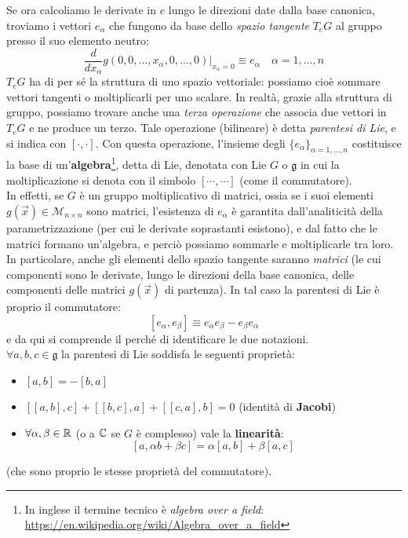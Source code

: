 \documentclass[../../FisicaTeorica.tex]{subfiles}
\begin{document}
Se ora calcoliamo le derivate in $e$ lungo le direzioni date dalla base canonica, troviamo i vettori $e_\alpha$ che fungono da base dello \textit{spazio tangente} $T_e G$ al gruppo presso il suo elemento neutro:
\begin{equation}
\frac{d}{dx_\alpha} g(0,0,\dots, x_\alpha, 0, \dots, 0)\Big|_{x_\alpha=0} \equiv e_\alpha\quad \alpha=1,\dots, n
\label{eqn:spazio-tangente-gruppo}
\end{equation}
$T_e G$ ha di per sé la struttura di uno spazio vettoriale: possiamo cioè sommare vettori tangenti o moltiplicarli per uno scalare. In realtà, grazie alla struttura di gruppo, possiamo trovare anche una \textit{terza operazione} che associa due vettori in $T_e G$ e ne produce un terzo. Tale operazione (bilineare) è detta \textit{parentesi di Lie}, e si indica con $[\cdot, \cdot]$. Con questa operazione, l'insieme degli $\{e_\alpha\}_{\alpha=1,\dots,n}$ costituisce la base di un'\textbf{algebra}\footnote{In inglese il termine tecnico è \textit{algebra over a field}: \url{https://en.wikipedia.org/wiki/Algebra_over_a_field}}, detta di Lie, denotata con Lie $G$ o $\mathfrak{g}$ in cui la moltiplicazione si denota con il simbolo $[\cdots, \cdots]$ (come il commutatore).\\
In effetti, se $G$ è un gruppo moltiplicativo di matrici, ossia se i suoi elementi $g(\vec{x}) \in \mathcal{M}_{ n\times n}$ sono matrici, l'esistenza di $e_\alpha$ è garantita dall'analiticità della parametrizzazione (per cui le derivate soprastanti esistono), e dal fatto che le matrici formano un'algebra, e perciò possiamo sommarle e moltiplicarle tra loro. In particolare, anche gli elementi dello spazio tangente saranno \textit{matrici} (le cui componenti sono le derivate, lungo le direzioni della base canonica, delle componenti delle matrici $g(\vec{x})$ di partenza). In tal caso la parentesi di Lie è proprio il commutatore:
\[
[e_\alpha, e_\beta] \equiv e_\alpha e_\beta - e_\beta e_\alpha
\]
e da qui si comprende il perché di identificare le due notazioni.\\
$\forall a,b,c \in \mathfrak{g}$ la parentesi di Lie soddisfa le seguenti proprietà:
\begin{itemize}
\item $[a,b]=-[b,a]$
\item $[[a,b],c]+[[b,c],a]+[[c,a],b]=0$ (identità di \textbf{Jacobi})
\item $\forall \alpha,\beta \in \mathbb{R}$ (o a $\mathbb{C}$ se $G$ è complesso) vale la \textbf{linearità}:
\[
[a, \alpha b + \beta c] = \alpha[a,b] + \beta[a,c]
\]
\end{itemize}
(che sono proprio le stesse proprietà del commutatore).\\
\end{document}
